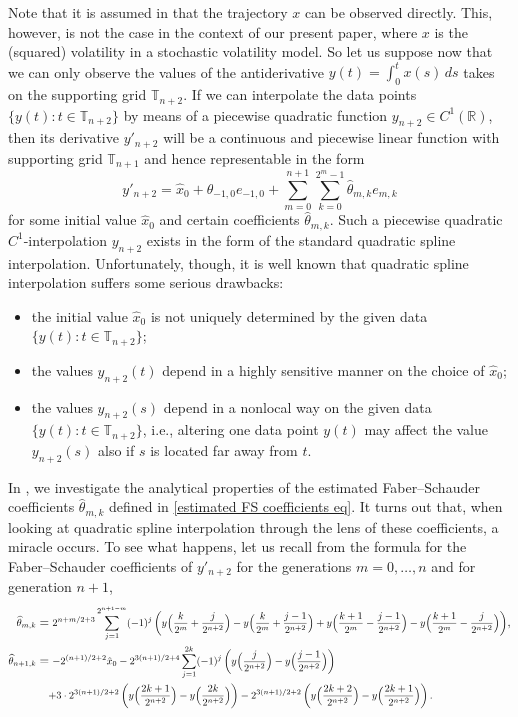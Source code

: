 \documentclass[12pt,reqno]{article}
\def\wh{\widehat}
\newcommand\scalemath[2]{\scalebox{#1}{\mbox{\ensuremath{\displaystyle #2}}}}
\numberwithin{equation}{section}
\theoremstyle{definition}
\def\wh{\widehat}
\newcommand{\bR}{\mathbb{R}}
\newcommand{\bT}{\mathbb{T}}
\begin{document}
Note that it is assumed in \cite{HanSchiedHurst} that the trajectory $x$ can be observed directly. This, however, is not the case in the context of our present paper, where 
 $x$ is the (squared) volatility in a stochastic volatility model. So let us suppose now
 that we can only observe  the values of the antiderivative $y(t)=\int_0^tx(s)\,ds$ takes on the supporting grid $\bT_{n+2}$. If we can interpolate the data points $\{y(t):t\in\bT_{n+2}\}$ by means of a piecewise quadratic function $y_{n+2}\in C^1(\bR)$, then its derivative $y'_{n+2}$ will be a continuous and piecewise linear function with supporting grid $\bT_{n+1}$ and hence  representable in the form 
\begin{equation}\label{estimated FS coefficients eq}
y'_{n+2}=\hat x_0+\wh\theta_{-1,0}e_{-1,0} + \sum_{m = 0}^{n+1}\sum_{k = 0}^{2^m-1}\wh\theta_{m,k}e_{m,k}
\end{equation}
for some initial value $\hat x_0$ and certain coefficients $\wh\theta_{m,k}$. Such a piecewise quadratic $C^1$-interpolation $y_{n+2}$ exists in the form of the standard quadratic spline interpolation. Unfortunately, though, it is well known that  quadratic spline interpolation suffers  some  serious drawbacks: 
\begin{itemize}
\item the initial value $\hat x_0$ is not uniquely determined by the given data $\{y(t):t\in\bT_{n+2}\}$;
\item the values $y_{n+2}(t)$ depend in a highly sensitive manner on the choice of $\hat x_0$;
\item the values $y_{n+2}(s)$ depend in a nonlocal way on the given data  $\{y(t):t\in\bT_{n+2}\}$, i.e., altering one data point $y(t)$ may affect the value   $y_{n+2}(s)$ also if $s$ is located far away from $t$. 
\end{itemize}
In \cite{HanSchiedMatrix}, we investigate the analytical properties of the estimated 
Faber--Schauder coefficients $\wh\theta_{m,k}$ defined in \eqref{estimated FS coefficients eq}. It turns out that,  when looking at quadratic spline interpolation through the lens of these coefficients, a miracle occurs.
To see what happens, let us recall from \cite[Theorem 2.1]{HanSchiedMatrix} the formula for the Faber--Schauder coefficients  of $y'_{n+2}$ for the generations $m=0,\dots, n$ and for generation $n+1$,
\begin{align}\scalemath{0.85}{
\wh\theta_{m,k}}&= \scalemath{0.85}{2^{n+m/2+3}\sum_{j = 1}^{2^{n+1-m}}(-1)^j\left(y\Big(\frac{k}{2^m}+\frac{j}{2^{n+2}}\Big)-y\Big(\frac{k}{2^m}+\frac{j-1}{2^{n+2}}\Big)+y\Big(\frac{k+1}{2^m}-\frac{j-1}{2^{n+2}}\Big)-y\Big(\frac{k+1}{2^m}-\frac{j}{2^{n+2}}\Big)\right)},\label{eq wh vartheta}\\
\scalemath{0.85}{ \wh\theta_{n+1,k} }&=\scalemath{0.85}{-2^{(n+1)/2+2}\hat x_0 -2^{3(n+1)/2+4}\sum_{j = 1}^{2k}(-1)^{j}\left(y\Big(\frac{j}{2^{n+2}}\Big)-y\Big(\frac{j-1}{2^{n+2}}\Big)\right)}\label{eq vartheta n+1}
 \\&\quad\scalemath{0.85}{+3 \cdot 2^{3(n+1)/2+2} \left(y\Big(\frac{2k+1}{2^{n+2}}\Big)-y\Big(\frac{2k}{2^{n+2}}\Big)\right)-2^{3(n+1)/2+2} \left(y\Big(\frac{2k+2}{2^{n+2}}\Big)-y\Big(\frac{2k+1}{2^{n+2}}\Big)\right).}\nonumber
\end{align}
\end{document}
